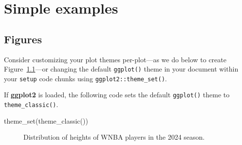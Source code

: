 \documentclass[
  11pt,
  letterpaper,
  twoside]{report}
\newenvironment{Shaded}{}{}
\newcommand{\FunctionTok}[1]{\textcolor[rgb]{0.25,0.47,0.95}{#1}}
\newcommand{\NormalTok}[1]{\textcolor[rgb]{0.22,0.23,0.26}{#1}}
\begin{document}
\chapter{Simple examples}\label{sec-simple}

\section{Figures}\label{figures}

Consider customizing your plot themes per-plot---as we do below to
create Figure~\ref{fig-wnba-ht}---or changing the default
\texttt{ggplot()} theme in your document within your \texttt{setup} code
chunks using \texttt{ggplot2::theme\_set()}.

If \textbf{ggplot2} is loaded, the following code sets the default
\texttt{ggplot()} theme to \texttt{theme\_classic()}.

\begin{Shaded}
\begin{Highlighting}[numbers=left,,]
\FunctionTok{theme\_set}\NormalTok{(}\FunctionTok{theme\_classic}\NormalTok{())}
\end{Highlighting}
\end{Shaded}

\begin{figure}


\caption{\label{fig-wnba-ht}Distribution of heights of WNBA players in
the 2024 season.}

\end{figure}%
\end{document}
